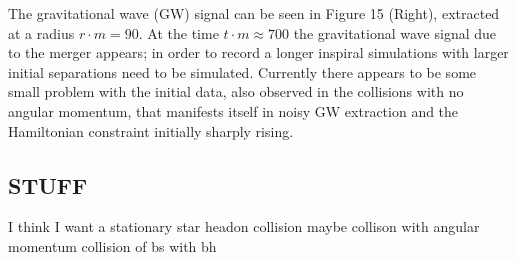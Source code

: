 The gravitational wave (GW) signal can be seen in Figure 15 (Right), extracted at a radius $r \cdot m = 90$. At the time $t \cdot m \approx 700$ the gravitational wave signal due to the merger appears; in order to record a longer inspiral simulations with larger initial separations need to be simulated. Currently there appears to be some small problem with the initial data, also observed in the collisions with no angular momentum, that manifests itself in noisy GW extraction and the Hamiltonian constraint initially sharply rising. 

  \subsection{STUFF}
  I think I want a stationary star
  headon collision
  maybe collison with angular momentum
  collision of bs with bh